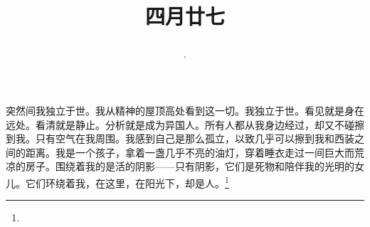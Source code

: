 \title{\date[d=3,m=6,y=2024][year:cn-y,年,month:cn,day:cn,日,·,weekday]·四月廿七 }
突然间我独立于世。我从精神的屋顶高处看到这一切。我独立于世。看见就是身在远处。看清就是静止。分析就是成为异国人。所有人都从我身边经过，却又不碰擦到我。只有空气在我周围。我感到自己是那么孤立，以致几乎可以擦到我和西装之间的距离。我是一个孩子，拿着一盏几乎不亮的油灯，穿着睡衣走过一间巨大而荒凉的房子。围绕着我的是活的阴影——只有阴影，它们是死物和陪伴我的光明的女儿。它们环绕着我，在这里，在阳光下，却是人。\footnote{ }

